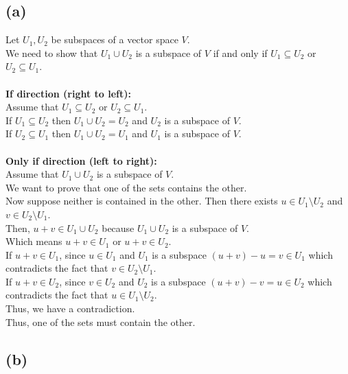 \documentclass{article}
\begin{document}
\subsection*{(a)}
Let \(U_1, U_2\) be subspaces of a vector space \(V\). \\
We need to show that \(U_1 \cup U_2\) is a subspace of \(V\) if and only if \(U_1 \subseteq U_2\) or \(U_2 \subseteq U_1\). \\
\\
\textbf{If direction (right to left):} \\
Assume that \(U_1 \subseteq U_2\) or \(U_2 \subseteq U_1\). \\
If \(U_1 \subseteq U_2\) then \(U_1 \cup U_2 = U_2\) and \(U_2\) is a subspace of \(V\). \\
If \(U_2 \subseteq U_1\) then \(U_1 \cup U_2 = U_1\) and \(U_1\) is a subspace of \(V\). \\
\\
\textbf{Only if direction (left to right):} \\
Assume that \(U_1 \cup U_2\) is a subspace of \(V\). \\
We want to prove that one of the sets contains the other. \\
Now suppose neither is contained in the other. Then there exists \(u \in U_1 \setminus U_2\) and \(v \in U_2 \setminus U_1\). \\
Then, \(u + v \in U_1 \cup U_2\) because \(U_1 \cup U_2\) is a subspace of \(V\). \\
Which means \(u+v \in U_1\) or \(u+v \in U_2\). \\
If \(u + v \in U_1\), since \(u \in U_1\) and \(U_1\) is a subspace \((u+v)-u=v \in U_1\) which contradicts the fact that \(v \in U_2 \setminus U_1\). \\
If \(u + v \in U_2\), since \(v \in U_2\) and \(U_2\) is a subspace \((u+v)-v=u \in U_2\) which contradicts the fact that \(u \in U_1 \setminus U_2\). \\
Thus, we have a contradiction. \\
Thus, one of the sets must contain the other. \\

\subsection*{(b)}
\end{document}
